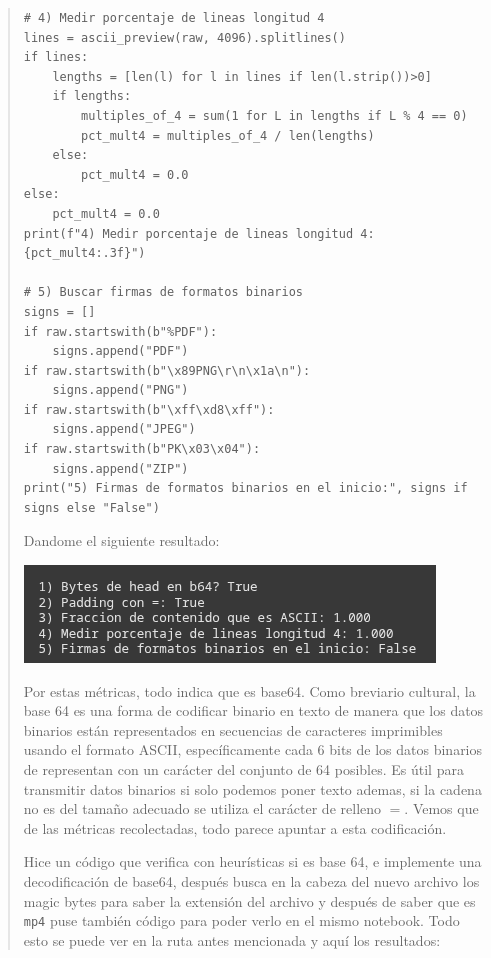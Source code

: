 \begin{quote}
\begin{verbatim}
# 4) Medir porcentaje de lineas longitud 4
lines = ascii_preview(raw, 4096).splitlines()
if lines:
    lengths = [len(l) for l in lines if len(l.strip())>0]
    if lengths:
        multiples_of_4 = sum(1 for L in lengths if L % 4 == 0)
        pct_mult4 = multiples_of_4 / len(lengths)
    else:
        pct_mult4 = 0.0
else:
    pct_mult4 = 0.0
print(f"4) Medir porcentaje de lineas longitud 4: {pct_mult4:.3f}")

# 5) Buscar firmas de formatos binarios
signs = []
if raw.startswith(b"%PDF"):
    signs.append("PDF")
if raw.startswith(b"\x89PNG\r\n\x1a\n"):
    signs.append("PNG")
if raw.startswith(b"\xff\xd8\xff"):
    signs.append("JPEG")
if raw.startswith(b"PK\x03\x04"):
    signs.append("ZIP")
print("5) Firmas de formatos binarios en el inicio:", signs if signs else "False")
    \end{verbatim}
    \vspace{.3cm}

    Dandome el siguiente resultado:
    \begin{center}
    	\includegraphics[width=.9\textwidth]{resources/ej3.2.png} 
    \end{center}

    Por estas métricas, todo indica que es base64. Como breviario cultural, la base 64 es una
    forma de codificar binario en texto de manera que los datos binarios están
    representados en secuencias de caracteres imprimibles usando el formato ASCII,
    específicamente cada 6 bits de los datos binarios de representan con un carácter del
    conjunto de 64 posibles. Es útil para transmitir datos binarios si solo podemos poner
    texto ademas, si la cadena no es del tamaño adecuado se utiliza el carácter de relleno $=$.
    Vemos que de las métricas recolectadas, todo parece apuntar a esta codificación.
    \vspace{.3cm}

    Hice un código que verifica con heurísticas si es base 64, e implemente una
    decodificación de base64, después busca en la cabeza del nuevo archivo los magic bytes para
    saber la extensión del archivo y después de saber que es \texttt{mp4} puse también
    código para poder verlo en el mismo notebook. Todo esto se puede ver en la ruta antes
    mencionada y aquí los resultados:


\end{quote}
